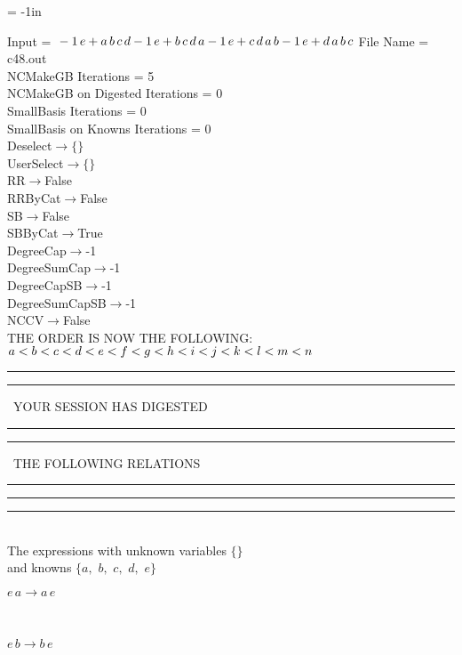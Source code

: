 \voffset = -1in
\evensidemargin 0.1in
\oddsidemargin 0.1in
\textheight 9in
\textwidth 6in

\normalsize
\baselineskip=12pt
\noindent
Input = 
$
\\-1\,
 e + a\,
 b\,
 c\,
 d\\
-1\,
 e + b\,
 c\,
 d\,
 a\\
-1\,
 e + c\,
 d\,
 a\,
 b\\
-1\,
 e + d\,
 a\,
 b\,
 c\\
$
File Name = c48.out\\
NCMakeGB Iterations = 5\\
NCMakeGB on Digested Iterations = 0\\
SmallBasis Iterations = 0\\
SmallBasis on Knowns Iterations = 0\\
Deselect$\rightarrow \{\}$\\
UserSelect$\rightarrow \{\}$\\
RR$\rightarrow $False\\
RRByCat$\rightarrow $False\\
SB$\rightarrow $False\\
SBByCat$\rightarrow $True\\
DegreeCap$\rightarrow $-1\\
DegreeSumCap$\rightarrow $-1\\
DegreeCapSB$\rightarrow $-1\\
DegreeSumCapSB$\rightarrow $-1\\
NCCV$\rightarrow $False\\
THE ORDER IS NOW THE FOLLOWING:\hfil\break
$
a<b<c<d<e<f<g<h<i<j<k<l<m<n\\
$
\rule[2pt]{6in}{4pt}\hfil\break
\rule[2pt]{1.879in}{4pt}
\ YOUR SESSION HAS DIGESTED\ 
\rule[2pt]{1.879in}{4pt}\hfil\break
\rule[2pt]{1.923in}{4pt}
\ THE FOLLOWING RELATIONS\ 
\rule[2pt]{1.923in}{4pt}\hfil\break
\rule[2pt]{6in}{4pt}\hfil\break
\rule[3pt]{6in}{.7pt}\\
The expressions with unknown variables $\{\}$\\
and knowns $\{a,
$ $
b,
$ $
c,
$ $
d,
$ $
e\}$\smallskip\\
\begin{minipage}{6in}
$
e\,
 a\rightarrow a\,
 e
$
\end{minipage}\medskip \\
\begin{minipage}{6in}
$
e\,
 b\rightarrow b\,
 e
$
\end{minipage}\medskip \\
